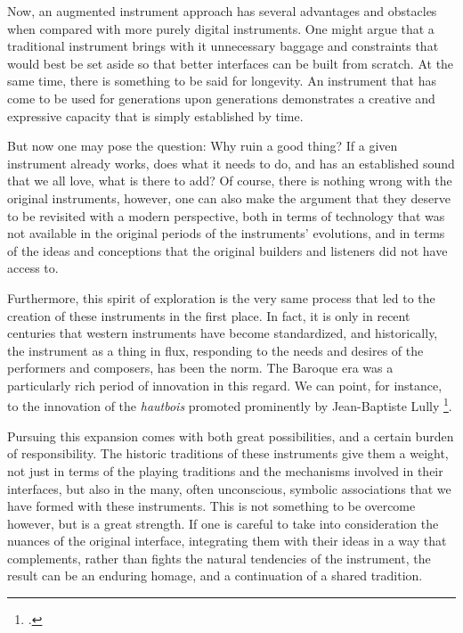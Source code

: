 \documentclass[12pt,twoside,maitrise]{dms_ks}
\theoremstyle{definition}
\begin{document}

Now, an augmented instrument approach has several advantages and obstacles when compared with more purely digital instruments. 
One might argue that a traditional instrument brings with it unnecessary baggage and constraints that would best be set aside so that better interfaces can be built from scratch.  
At the same time, there is something to be said for longevity.
An instrument that has come to be used for generations upon generations demonstrates a creative and expressive capacity that is simply established by time.

But now one may pose the question: Why ruin a good thing?
If a given instrument already works, does what it needs to do, and has an established sound that we all love, what is there to add?
Of course, there is nothing wrong with the original instruments, however, one can also make the argument that they deserve to be revisited with a modern perspective, both in terms of technology that was not available in the original periods of the instruments' evolutions, and in terms of the ideas and conceptions that the original builders and listeners did not have access to. 

Furthermore, this spirit of exploration is the very same process that led to the creation of these instruments in the first place.
In fact, it is only in recent centuries that western instruments have become standardized, and historically, the instrument as a thing in flux, responding to the needs and desires of the performers and composers, has been the norm.
The Baroque era was a particularly rich period of innovation in this regard.
We can point, for instance, to the innovation of the \textit{hautbois} promoted prominently by Jean-Baptiste Lully \footcite[23--38]{wainwright_renaissance_2017}.


Pursuing this expansion comes with both great possibilities, and a certain burden of responsibility.
The historic traditions of these instruments give them a weight, not just in terms of the playing traditions and the mechanisms involved in their interfaces, but also in the many, often unconscious, symbolic associations that we have formed with these instruments.
This is not something to be overcome however, but is a great strength.
If one is careful to take into consideration the nuances of the original interface, integrating them with their ideas in a way that complements, rather than fights the natural tendencies of the instrument, the result can be an enduring homage, and a continuation of a shared tradition.
\end{document}
